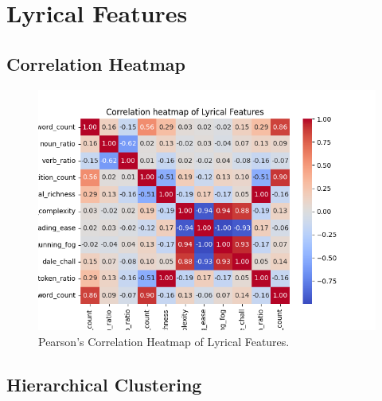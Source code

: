 

\section{Lyrical Features}

\subsection*{Correlation Heatmap}
\label{sec:correlationheatmapsspotifyfeatures}

\begin{center}
\begin{figure}[H]
  \centering
  \includegraphics[width=6in]{img/corr_heatmap_lyrical.png}
  \caption{Pearson's Correlation Heatmap of Lyrical Features.}
  \label{Figure:fig_beh}
\end{figure}
\end{center}

\subsection*{Hierarchical Clustering}
\label{sec:hierarchicalclustering}

